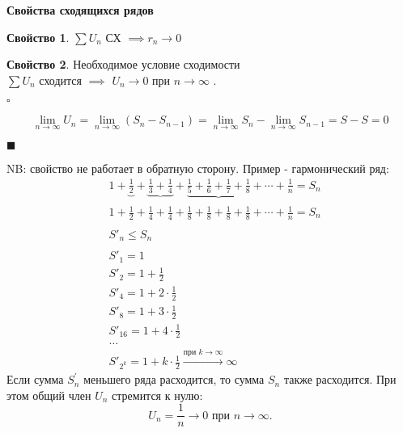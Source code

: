 \documentclass[11pt,a4paper]{article}
\theoremstyle{definition}
\newtheorem{sv}{Свойство}
\newenvironment{myproof}[1][\proofname]{
  \noindent \textbf{#1}
  \begin{flushleft}
    \hspace{-1em}$\square$
  \end{flushleft}
}{
  \hfill $\blacksquare$
}
\begin{document}
\par
\textbf{Свойства сходящихся рядов}

\begin{sv}
    $\sum U_n $ СХ $\implies r_n\to 0$ 
\end{sv}


\begin{sv}
    Необходимое условие сходимости\\
    $\sum{U_n}$ сходится $\implies$ $U_n \to 0$ при $n\to \infty$ . 

    \begin{myproof}
    \begin{equation}
        \lim_{n\to\infty} U_n 
        = \lim_{n\to\infty} (S_n - S_{n - 1})
        = \lim_{n\to\infty}S_n - \lim_{n\to\infty} S_{n-1} 
        = S - S 
        = 0
    \end{equation}
\end{myproof}

NB: свойство не работает в обратную сторону. Пример - гармонический ряд: 
    \begin{equation}
        \begin{aligned}
            &1 + \underbrace{\frac{1}{2}}_{\text{}} + \underbrace{\frac{1}{3} + \frac{1}{4}}_{\text{}} + \underbrace{\frac{1}{5} + \frac{1}{6} + \frac{1}{7} + \frac{1}{8}}_{\text{}} + \cdots + \frac{1}{n} = S_n \\
            &1 + \frac{1}{2} + \frac{1}{4} + \frac{1}{4} + \frac{1}{8} + \frac{1}{8} + \frac{1}{8} + \frac{1}{8} + \cdots + \frac{1}{n} = S_n \\ \\
            &S'_n \leq S_n \\\\
            &S'_1 = 1 \\
            &S'_2 = 1 + \frac{1}{2} \\
            &S'_4 = 1 + 2 \cdot \frac{1}{2} \\
            &S'_8 = 1 + 3 \cdot \frac{1}{2} \\
            &S'_{16} = 1 + 4 \cdot \frac{1}{2} \\
            &\dots \\
            &S'_{2^k} = 1 + k \cdot \frac{1}{2} \xrightarrow{\text{при $k\to\infty$}} \infty 
        \end{aligned} 
    \end{equation}
    Если сумма \( S^{'}_n \) меньшего ряда расходится, то сумма \( S_n \) также расходится. При этом общий член \( U_n \) стремится к нулю:
    \[
    U_n = \frac{1}{n} \to 0 \text{ при } n \to \infty.
    \]

\end{sv}
\end{document}
